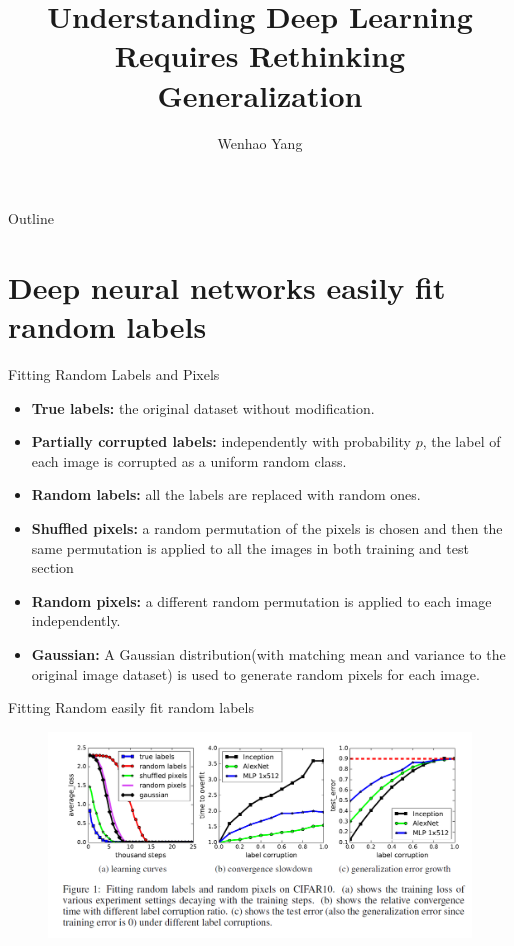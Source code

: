 \documentclass[mathserif]{beamer}
\begin{document}
\title{Understanding Deep Learning Requires Rethinking Generalization}

\author{Wenhao Yang
}
\begin{frame}
  \titlepage
\end{frame}

\date{}

\begin{frame}{Outline}
\tableofcontents
\end{frame}

\section{Deep neural networks easily fit random labels}
\begin{frame}[t]{Fitting Random Labels and Pixels}
  \begin{itemize}
  \item \textbf{True labels: }the original dataset without modification.
  \item \textbf{Partially corrupted labels: }independently with probability $p$,
  the label of each image is corrupted as a uniform random class.
  \item \textbf{Random labels: }all the labels are replaced with random ones.
  \item \textbf{Shuffled pixels: }a random permutation of the pixels is chosen
  and then the same permutation is applied to all the images in both training
  and test section
  \item \textbf{Random pixels: }a different random permutation is applied to
  each image independently.
  \item \textbf{Gaussian: }A Gaussian distribution(with matching mean and
  variance to the original image dataset) is used to generate random
  pixels for each image.
\end{itemize}
\end{frame}
\begin{frame}[t]{Fitting Random easily fit random labels}
  \begin{figure}
    \centering
    \includegraphics[scale=0.5]{fig/1}
  \end{figure}
\end{frame}
\end{document}
